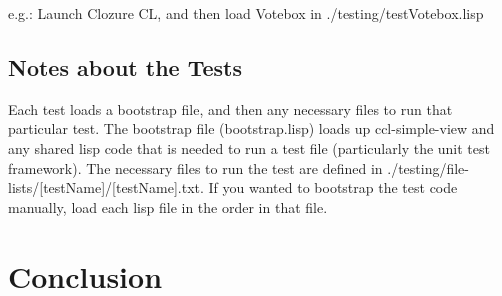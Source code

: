 \documentclass[12pt]{article} %
\begin{document}
e.g.: Launch Clozure CL, and then load Votebox in ./testing/testVotebox.lisp

\subsection{Notes about the Tests}

	Each test loads a bootstrap file, and then any necessary files to run that particular test.
		The bootstrap file (bootstrap.lisp) loads up ccl-simple-view and any shared lisp code that is needed to run a test file (particularly the unit test framework). 
		The necessary files to run the test are defined in ./testing/file-lists/[testName]/[testName].txt. If you wanted to bootstrap the test code manually, load each lisp file in the order in that file.












\section{Conclusion} %

\lipsum[12-13]
\end{document}
